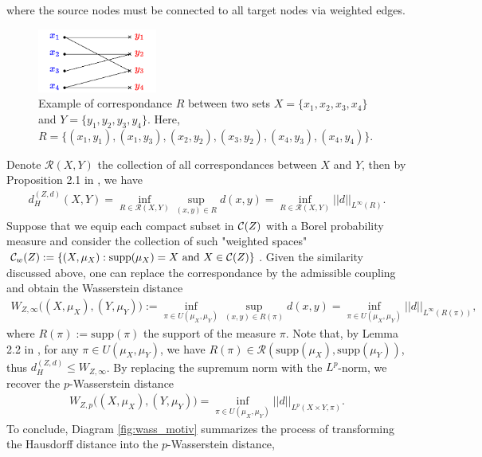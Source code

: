 where the source nodes must be connected to all target nodes via weighted edges.
\begin{figure}[t]
  \centering
  \includegraphics[width=0.35\textwidth,keepaspectratio]{Chapitre1/figures/correspondance.pdf}
  \caption{Example of correspondance $R$ between two sets $X = \{x_1, x_2, x_3, x_4\}$ and
  $Y = \{y_1, y_2, y_3, y_4 \}$. Here,
  $R = \{(x_1, y_1), (x_1, y_3), (x_2, y_2), (x_3, y_2), (x_4, y_3), (x_4, y_4) \}$.}
  \label{fig:correspondance}
\end{figure}
Denote $\mathcal R(X,Y)$ the collection of all correspondances between $X$ and $Y$,
then by Proposition 2.1 in \citep{Memoli11}, we have
\begin{align} \label{haus_corres}
  d_{H}^{(Z, d)}(X,Y) = \inf_{R \in  \mathcal R(X,Y)} \sup_{(x,y) \in R} d(x,y)
  = \inf_{R \in \mathcal R(X,Y)} \vert\vert d \vert\vert_{L^{\infty}(R)}.
\end{align}
Suppose that we equip each compact subset in $\mathcal C(Z)$ with a Borel probability measure and consider
the collection of such "weighted spaces"
$\mathcal C_w(Z) := \{(X,\mu_X): \text{supp}(\mu_X) = X \text{ and } X \in \mathcal C(Z) \}$.
Given the similarity discussed above,
one can replace the correspondance by the admissible coupling and obtain the Wasserstein distance
\begin{align}
  W_{Z, \infty}\big((X,\mu_X), (Y,\mu_Y) \big) :=
  \inf_{\pi \in U(\mu_X, \mu_Y)} \sup_{(x,y) \in R(\pi)} d(x,y)
  = \inf_{\pi \in U(\mu_X, \mu_Y)} \vert\vert d \vert\vert_{L^{\infty}(R(\pi))},
\end{align}
where $R(\pi) := \text{supp}(\pi)$ the support of the measure $\pi$. Note that,
by Lemma 2.2 in \citep{Memoli11}, for any $\pi \in U(\mu_X, \mu_Y)$, we have
$R(\pi) \in  \mathcal R(\text{supp}(\mu_X), \text{supp}(\mu_Y))$, thus
$d_{H}^{(Z, d)} \leq W_{Z, \infty}$. By replacing the supremum norm with the $L^p$-norm,
we recover the $p$-Wasserstein distance
\begin{align}
    W_{Z, p}\big( (X,\mu_X), (Y,\mu_Y) \big)
    = \inf_{\pi \in U(\mu_X, \mu_Y)} \vert\vert d \vert\vert_{L^p(X \times Y, \pi)}.
\end{align}
To conclude, Diagram \ref{fig:wass_motiv} summarizes
the process of transforming the Hausdorff distance into the $p$-Wasserstein distance,
